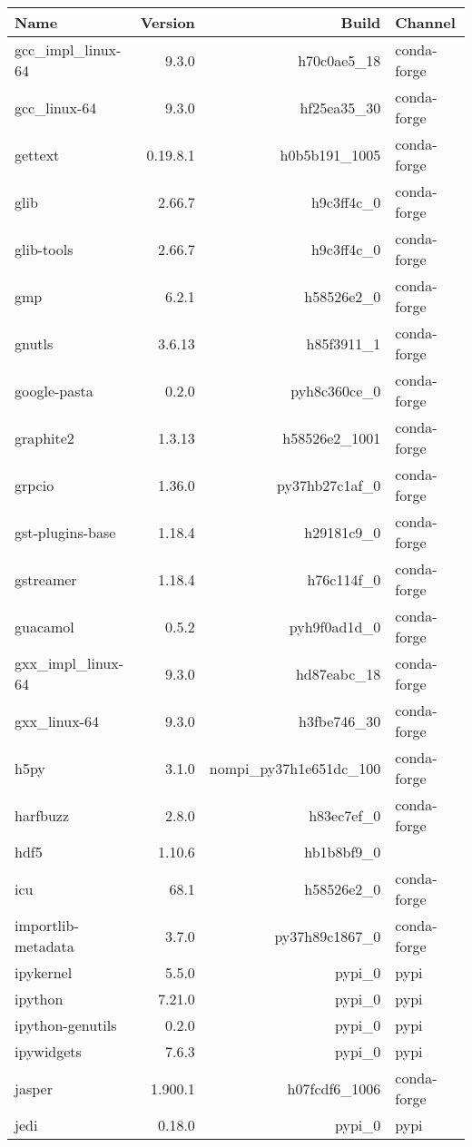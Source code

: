 \begin{table}
	\begin{center}
		\begin{tabular}{|l|r|r|l|}
			\textbf{Name} &\textbf{Version} &\textbf{Build} &\textbf{Channel} \\
			\hline
			gcc\_impl\_linux-64 &9.3.0 & h70c0ae5\_18 &conda-forge \\
			gcc\_linux-64 &9.3.0 & hf25ea35\_30 &conda-forge \\
			gettext &0.19.8.1 & h0b5b191\_1005 &conda-forge \\
			glib &2.66.7 & h9c3ff4c\_0 &conda-forge \\
			glib-tools &2.66.7 & h9c3ff4c\_0 &conda-forge \\
			gmp &6.2.1 & h58526e2\_0 &conda-forge \\
			gnutls &3.6.13 & h85f3911\_1 &conda-forge \\
			google-pasta &0.2.0 & pyh8c360ce\_0 &conda-forge \\
			graphite2 &1.3.13 & h58526e2\_1001 &conda-forge \\
			grpcio &1.36.0 & py37hb27c1af\_0 &conda-forge \\
			gst-plugins-base &1.18.4 & h29181c9\_0 &conda-forge \\
			gstreamer &1.18.4 & h76c114f\_0 &conda-forge \\
			guacamol &0.5.2 & pyh9f0ad1d\_0 &conda-forge \\
			gxx\_impl\_linux-64 &9.3.0 & hd87eabc\_18 &conda-forge \\
			gxx\_linux-64 &9.3.0 & h3fbe746\_30 &conda-forge \\
			h5py &3.1.0 & nompi\_py37h1e651dc\_100 &conda-forge \\
			harfbuzz &2.8.0 & h83ec7ef\_0 &conda-forge \\
			hdf5 &1.10.6 & hb1b8bf9\_0 & \\
			icu &68.1 & h58526e2\_0 &conda-forge \\
			importlib-metadata &3.7.0 & py37h89c1867\_0 &conda-forge \\
			ipykernel &5.5.0 & pypi\_0 &pypi \\
			ipython &7.21.0 & pypi\_0 &pypi \\
			ipython-genutils &0.2.0 & pypi\_0 &pypi \\
			ipywidgets &7.6.3 & pypi\_0 &pypi \\
			jasper &1.900.1 & h07fcdf6\_1006 &conda-forge \\
			jedi &0.18.0 & pypi\_0 &pypi \\

\end{tabular}
\end{center}
\end{table}
